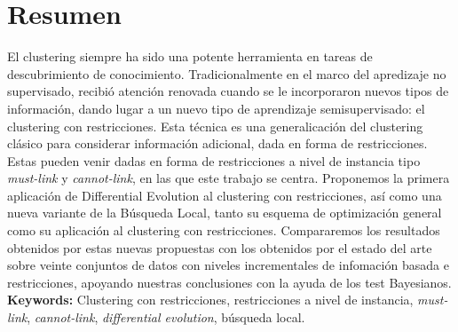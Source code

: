 \begingroup

\chapter*{Resumen}

El clustering siempre ha sido una potente herramienta en tareas de descubrimiento de conocimiento. Tradicionalmente en el marco del apredizaje no supervisado, recibió atención renovada cuando se le incorporaron nuevos tipos de información, dando lugar a un nuevo tipo de aprendizaje semisupervisado: el clustering con restricciones. Esta técnica es una generalicación del clustering clásico para considerar información adicional, dada en forma de restricciones. Estas pueden venir dadas en forma de restricciones a nivel de instancia tipo \textit{must-link} y \textit{cannot-link}, en las que este trabajo se centra. Proponemos la primera aplicación de Differential Evolution al clustering con restricciones, así como una nueva variante de la Búsqueda Local, tanto su esquema de optimización general como su aplicación al clustering con restricciones. Compararemos los resultados obtenidos por estas nuevas propuestas con los obtenidos por el estado del arte sobre veinte conjuntos de datos con niveles incrementales de infomación basada e restricciones, apoyando nuestras conclusiones con la ayuda de los test Bayesianos. \\


\noindent\textbf{Keywords:} Clustering con restricciones, restricciones a nivel de instancia, \textit{must-link}, \textit{cannot-link}, \textit{differential evolution}, búsqueda local.


\endgroup